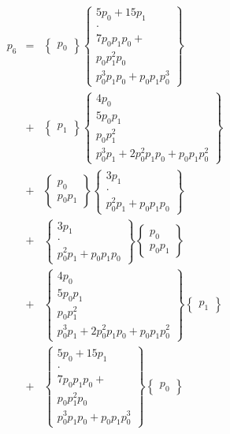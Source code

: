 \documentclass[a4paper,12pt]{article}
\numberwithin{definition}{section}
\numberwithin{lemma}{section}
\numberwithin{proposition}{section}
\numberwithin{theorem}{section}
\numberwithin{grammar}{section}
\numberwithin{program}{section}
\numberwithin{convention}{section}
\numberwithin{corollary}{section}
\numberwithin{principle}{section}
\begin{document}
$$\begin{array}{lcl}
p_6 & = & \begin{Bmatrix} p_0 \end{Bmatrix} \begin{Bmatrix} 5 p_0 + 15 p_1 \\ \cdot \\ 7 p_0 p_1 p_0 + \\ p_0 p_1^2 p_0 \\ p_0^3 p_1 p_0 + p_0 p_1 p_0^3 \end{Bmatrix} \\
    & + & \begin{Bmatrix} p_1 \end{Bmatrix} \begin{Bmatrix} 4 p_0 \\ 5 p_0 p_1 \\ p_0 p_1^2 \\ p_0^3 p_1 + 2 p_0^2 p_1 p_0 + p_0 p_1 p_0^2 \end{Bmatrix} \\
    & + & \begin{Bmatrix} p_0 \\  p_0 p_1 \end{Bmatrix} \begin{Bmatrix} 3 p_1 \\ \cdot \\ p_0^2 p_1 + p_0 p_1 p_0 \end{Bmatrix}  \\
    & + & \begin{Bmatrix} 3 p_1 \\ \cdot \\ p_0^2 p_1 + p_0 p_1 p_0 \end{Bmatrix} \begin{Bmatrix} p_0 \\  p_0 p_1 \end{Bmatrix} \\
    & + & \begin{Bmatrix} 4 p_0 \\ 5 p_0 p_1 \\ p_0 p_1^2 \\ p_0^3 p_1 + 2 p_0^2 p_1 p_0 + p_0 p_1 p_0^2 \end{Bmatrix} \begin{Bmatrix} p_1 \end{Bmatrix} \\
    & + & \begin{Bmatrix} 5 p_0 + 15 p_1 \\ \cdot \\ 7 p_0 p_1 p_0 + \\ p_0 p_1^2 p_0 \\ p_0^3 p_1 p_0 + p_0 p_1 p_0^3 \end{Bmatrix}\begin{Bmatrix} p_0 \end{Bmatrix}\\
\end{array}$$
\end{document}
